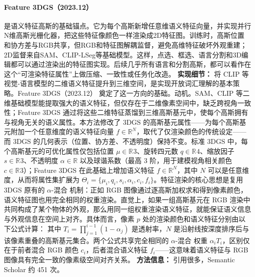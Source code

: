 \paragraph{Feature 3DGS（2023.12）\cite{2312_03203}}
是语义特征高斯的基础锚点。它为每个高斯新增任意维语义特征向量，并实现并行N维高斯光栅化器，把这些特征像颜色一样渲染成2D特征图。训练时，高斯位置和协方差与RGB共享，但RGB和特征图解耦监督，避免高维特征破坏外观重建；2D监督来自SAM、CLIP-LSeg等基础模型。这样，点选、框选、语言分割和3D编辑都可以通过渲染出的特征图实现。后续几乎所有语言和分割高斯，都可以看作在这个“可渲染特征属性”上做压缩、一致性或任务化改造。
\textbf{实现细节：} 将 CLIP 等视觉-语言模型的二维语义特征提升到三维空间，是实现开放词汇理解的基本策略。Feature 3DGS（2023.12） 奠定了这一方向的基础。动机。SAM、CLIP 等二维基础模型能提取强大的语义特征，但仅存在于二维像素空间中，缺乏跨视角一致性；Feature 3DGS 通过将这些二维特征蒸馏到三维高斯基元中，使每个高斯拥有与视角无关的语义属性。本方法修改了 3DGS 的高斯基元属性——为每个高斯基元附加一个任意维度的语义特征向量 $f \in \mathbb{R}^N$，取代了仅渲染颜色的传统设定——而 3DGS 的几何表示（位置、协方差、不透明度）保持不变。标准 3DGS 中，每个高斯基元的可优化属性仅包括位置 $\mu \in \mathbb{R}^{}3$、旋转四元数 $q \in \mathbb{R}^{}4$、缩放因子 $s \in \mathbb{R}^{}3$、不透明度 $\alpha \in \mathbb{R}$ 以及球谐系数（最高 3 阶，用于建模视角相关颜色 $c \in \mathbb{R}^{}3$）；Feature 3DGS 在此基础上增加语义特征 $f \in \mathbb{R}^N$，其中 $N$ 可以是任意维度，从而将属性集扩展为 $\Theta_i = \{\mu_i, q_i, s_i, \alpha_i, c_i, f_i\}$。特征渲染的核心思想是复用 3DGS 原有的 $\alpha$-混合 机制：正如 RGB 图像通过逐高斯加权求和得到像素颜色，语义特征图也用完全相同的权重渲染。直觉上，如果一组高斯基元在 RGB 渲染中共同构成了某个物体的外观，那么用同一组权重渲染语义特征，就能保证语义信息与外观信息在空间上对齐。具体而言，像素 $p$ 处的渲染颜色和语义特征分别由以下公式计算： 其中 $T_i = \prod_{j=1}^{i-1}(1 - \alpha_j)$ 是透射率，$N$ 是沿射线按深度排序后与该像素重叠的高斯基元集合。两个公式共享完全相同的 $\alpha$-混合 权重 $\alpha_i T_i$，区别仅在于前者混合 RGB 颜色 $c_i$，后者混合语义特征 $f_i$——这意味着语义特征与 RGB 图像具有完全一致的像素级空间对齐关系。
\textbf{方法信息：} 引用很多，Semantic Scholar 约 451 次。
